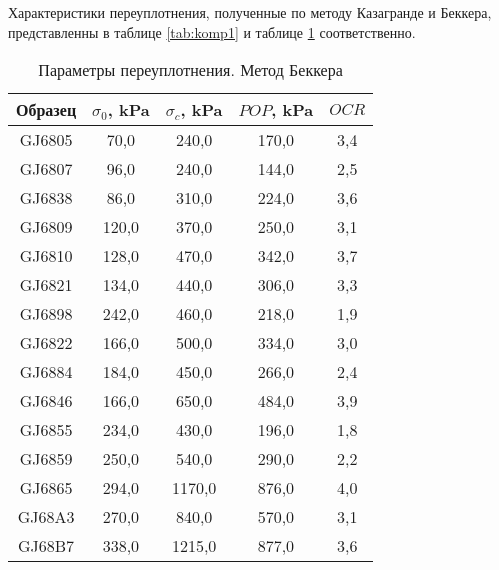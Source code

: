 Характеристики переуплотнения, полученные по методу Казагранде и Беккера,
представленны в таблице \ref{tab:komp1} и таблице \ref{tab:komp2} соответственно.

\begin{table}[]
  \centering
  \begin{threeparttable}
    \caption{Параметры переуплотнения. Метод Беккера}\label{tab:komp2}
  \begin{tabular}{|c|c|c|c|c|}
  \hline
  Образец  & $\sigma_0$, \si{\kilo\Pa} & $\sigma_c$, \si{\kilo\Pa} & $POP$, \si{\kilo\Pa}   & $OCR$ \\ \hline
  GJ6805 & 70,0  & 240,0  & 170,0 & 3,4 \\ \hline
GJ6807 & 96,0  & 240,0  & 144,0 & 2,5 \\ \hline
GJ6838 & 86,0  & 310,0  & 224,0 & 3,6 \\ \hline
GJ6809 & 120,0 & 370,0  & 250,0 & 3,1 \\ \hline
GJ6810 & 128,0 & 470,0  & 342,0 & 3,7 \\ \hline
GJ6821 & 134,0 & 440,0  & 306,0 & 3,3 \\ \hline
GJ6898 & 242,0 & 460,0  & 218,0 & 1,9 \\ \hline
GJ6822 & 166,0 & 500,0  & 334,0 & 3,0 \\ \hline
GJ6884 & 184,0 & 450,0  & 266,0 & 2,4 \\ \hline
GJ6846 & 166,0 & 650,0  & 484,0 & 3,9 \\ \hline
GJ6855 & 234,0 & 430,0  & 196,0 & 1,8 \\ \hline
GJ6859 & 250,0 & 540,0  & 290,0 & 2,2 \\ \hline
GJ6865 & 294,0 & 1170,0 & 876,0 & 4,0 \\ \hline
GJ68A3 & 270,0 & 840,0  & 570,0 & 3,1 \\ \hline
GJ68B7 & 338,0 & 1215,0 & 877,0 & 3,6 \\ \hline
  \end{tabular}
\end{threeparttable}
  \end{table}

